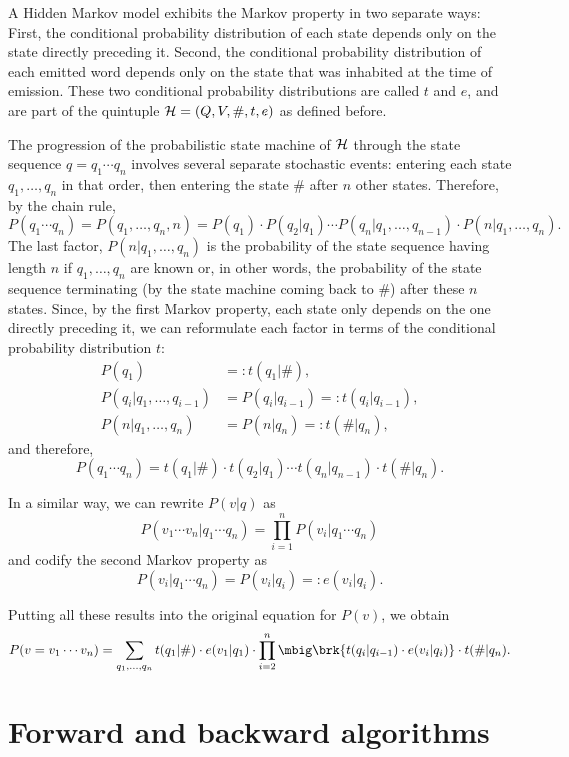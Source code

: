 A Hidden Markov model exhibits the Markov property in two separate ways: First,
the conditional probability distribution of each state depends only on the
state directly preceding it. Second, the conditional probability distribution
of each emitted word depends only on the state that was inhabited at the time
of emission. These two conditional probability distributions are called $t$ and
$e$, and are part of the quintuple $\mathcal H=(Q,V,\#,t,e)$ as defined before.

The progression of the probabilistic state machine of $\mathcal H$ through the state
sequence $q=q_1\cdots q_n$ involves several separate stochastic events:
entering each state $q_1,\ldots,q_n$ in that order, then entering the state
$\#$ after $n$ other states. Therefore, by the chain rule,
\[
 P(q_1\cdots q_n) = P(q_1,\ldots,q_n,n) = P(q_1) \cdot P(q_2|q_1) \cdots P(q_n|q_1,\ldots,q_{n-1}) \cdot P(n|q_1,\ldots,q_n).
\]
The last factor, $P(n|q_1,\ldots,q_n)$ is the probability of the state sequence
having length $n$ if $q_1,\ldots,q_n$ are known or, in other words, the
probability of the state sequence terminating (by the state machine coming back
to $\#$) after these $n$ states. Since, by the first Markov property, each
state only depends on the one directly preceding it, we can reformulate each
factor in terms of the conditional probability distribution $t$:
\begin{align*}
 P(q_1) &=: t(q_1|\#), \\
 P(q_i|q_1,\ldots,q_{i-1}) &= P(q_i|q_{i-1}) =: t(q_i|q_{i-1}), \\
 P(n|q_1,\ldots,q_n) &= P(n|q_n) =: t(\#|q_n),
\end{align*}
and therefore,
\[
 P(q_1\cdots q_n) = t(q_1|\#) \cdot t(q_2|q_1) \cdots t(q_n|q_{n-1}) \cdot t(\#|q_n).
\]

In a similar way, we can rewrite $P(v|q)$ as
\[
 P(v_1\cdots v_n|q_1\cdots q_n) = \prod_{i=1}^n P(v_i|q_1\cdots q_n)
\]
and codify the second Markov property as
\[
 P(v_i|q_1\cdots q_n) = P(v_i|q_i) =: e(v_i|q_i).
\]

Putting all these results into the original equation for $P(v)$, we obtain
\[
 P(v=v_1\cdots v_n) = \sum_{q_1,\ldots,q_n} t(q_1|\#) \cdot e(v_1|q_1) \cdot \prod_{i=2}^n \mbig\brk{t(q_i|q_{i-1}) \cdot e(v_i|q_i)} \cdot t(\#|q_n).
\]

\section{Forward and backward algorithms}

